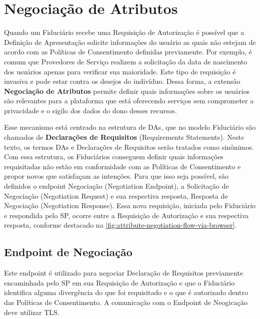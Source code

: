\section{Negociação de Atributos}\label{section:attribute-negotiation}

Quando um Fiduciário recebe uma Requisição de Autorização é possível que a Definição de Apresentação solicite informações do usuário as quais não estejam de acordo com as Políticas de Consentimento definidas previamente. Por exemplo, é comum que Provedores de Serviço realizem a solicitação da data de nascimento dos  usuários apenas para verificar sua maioridade. Este tipo de requisição é invasiva e pode estar contra os desejos do indivíduo. Dessa forma, a extensão \textbf{Negociação de Atributos} permite definir quais informações sobre os usuários são relevantes para a plataforma que está oferecendo serviços sem comprometer a privacidade e o sigilo dos dados do dono desses recursos.

Esse mecanismo está centrado na estrutura de \acs{DA}s, que no modelo Fiduciário são chamados de \textbf{Declarações de Requisitos} (Requirements Statements). Neste texto, os termos \acs{DA}s e Declarações de Requisitos serão tratados como sinônimos. Com essa estrutura, os Fiduciários conseguem definir quais informações requisitadas não estão em conformidade com as Políticas de Consentimento e propor novos que satisfaçam as intenções. Para que isso seja possível, são definidos o endpoint Negociação (Negotiation Endpoint), a Solicitação de Negociação (Negotiation Request) e sua respectiva resposta, Resposta de Negociação (Negotiation Response). 
Essa nova requisição, iniciada pelo Fiduciário e respondida pelo \acs{SP}, ocorre entre a Requisição de Autorização e sua respectiva resposta, conforme destacado na \autoref{fig:attribute-negotiation-flow-via-browser}.



\subsection{Endpoint de Negociação}\label{subsection:endpoint-negociação}

Este endpoint é utilizado para negociar Declaração de Requisitos previamente encaminhada pelo \acs{SP} em sua Requisição de Autorização e que o Fiduciário identifica alguma divergência do que foi requisitado e o que é autorizado dentro das Políticas de Consentimento. A comunicação com o Endpoint de Neogicação deve utilizar TLS.

